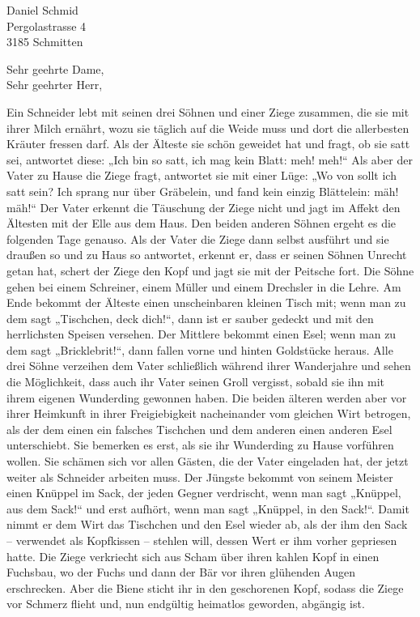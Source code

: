 \documentclass[10pt]{letter}
\date{Schmitten, den 01. August 2010 }
\begin{document}
\begin{letter}{Daniel Schmid\\ Pergolastrasse 4 \\ 3185 Schmitten}

\subject{Ich bin ein Betreff und kann unter Umständen sehr lange sein. Was wird wohl passieren wenn Ich umgebroche werden muss?\\}
\opening{Sehr geehrte Dame, \\
Sehr geehrter Herr,\\}

Ein Schneider lebt mit seinen drei Söhnen und einer Ziege zusammen, die sie mit ihrer Milch ernährt, wozu sie täglich auf die Weide muss und dort die allerbesten Kräuter fressen darf. Als der Älteste sie schön geweidet hat und fragt, ob sie satt sei, antwortet diese: „Ich bin so satt, ich mag kein Blatt: meh! meh!“ Als aber der Vater zu Hause die Ziege fragt, antwortet sie mit einer Lüge: „Wo von sollt ich satt sein? Ich sprang nur über Gräbelein, und fand kein einzig Blättelein: mäh! mäh!“ Der Vater erkennt die Täuschung der Ziege nicht und jagt im Affekt den Ältesten mit der Elle aus dem Haus. Den beiden anderen Söhnen ergeht es die folgenden Tage genauso. Als der Vater die Ziege dann selbst ausführt und sie draußen so und zu Haus so antwortet, erkennt er, dass er seinen Söhnen Unrecht getan hat, schert der Ziege den Kopf und jagt sie mit der Peitsche fort. Die Söhne gehen bei einem Schreiner, einem Müller und einem Drechsler in die Lehre. Am Ende bekommt der Älteste einen unscheinbaren kleinen Tisch mit; wenn man zu dem sagt „Tischchen, deck dich!“, dann ist er sauber gedeckt und mit den herrlichsten Speisen versehen. Der Mittlere bekommt einen Esel; wenn man zu dem sagt „Bricklebrit!“, dann fallen vorne und hinten Goldstücke heraus. Alle drei Söhne verzeihen dem Vater schließlich während ihrer Wanderjahre und sehen die Möglichkeit, dass auch ihr Vater seinen Groll vergisst, sobald sie ihn mit ihrem eigenen Wunderding gewonnen haben. Die beiden älteren werden aber vor ihrer Heimkunft in ihrer Freigiebigkeit nacheinander vom gleichen Wirt betrogen, als der dem einen ein falsches Tischchen und dem anderen einen anderen Esel unterschiebt. Sie bemerken es erst, als sie ihr Wunderding zu Hause vorführen wollen. Sie schämen sich vor allen Gästen, die der Vater eingeladen hat, der jetzt weiter als Schneider arbeiten muss. Der Jüngste bekommt von seinem Meister einen Knüppel im Sack, der jeden Gegner verdrischt, wenn man sagt „Knüppel, aus dem Sack!“ und erst aufhört, wenn man sagt „Knüppel, in den Sack!“. Damit nimmt er dem Wirt das Tischchen und den Esel wieder ab, als der ihm den Sack – verwendet als Kopfkissen – stehlen will, dessen Wert er ihm vorher gepriesen hatte. Die Ziege verkriecht sich aus Scham über ihren kahlen Kopf in einen Fuchsbau, wo der Fuchs und dann der Bär vor ihren glühenden Augen erschrecken. Aber die Biene sticht ihr in den geschorenen Kopf, sodass die Ziege vor Schmerz flieht und, nun endgültig heimatlos geworden, abgängig ist.

\end{letter}
\end{document}
